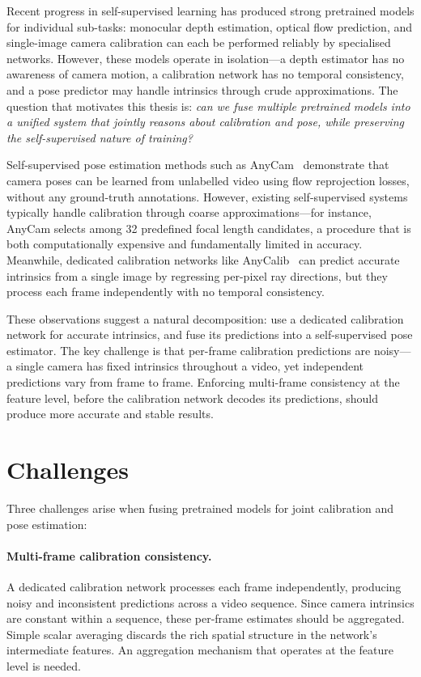 Recent progress in self-supervised learning has produced strong pretrained models for individual sub-tasks: monocular depth estimation, optical flow prediction, and single-image camera calibration can each be performed reliably by specialised networks. However, these models operate in isolation---a depth estimator has no awareness of camera motion, a calibration network has no temporal consistency, and a pose predictor may handle intrinsics through crude approximations. The question that motivates this thesis is: \emph{can we fuse multiple pretrained models into a unified system that jointly reasons about calibration and pose, while preserving the self-supervised nature of training?}

Self-supervised pose estimation methods such as AnyCam~\parencite{wimbauer2025anycam} demonstrate that camera poses can be learned from unlabelled video using flow reprojection losses, without any ground-truth annotations. However, existing self-supervised systems typically handle calibration through coarse approximations---for instance, AnyCam selects among 32 predefined focal length candidates, a procedure that is both computationally expensive and fundamentally limited in accuracy. Meanwhile, dedicated calibration networks like AnyCalib~\parencite{tirado2025anycalib} can predict accurate intrinsics from a single image by regressing per-pixel ray directions, but they process each frame independently with no temporal consistency.

These observations suggest a natural decomposition: use a dedicated calibration network for accurate intrinsics, and fuse its predictions into a self-supervised pose estimator. The key challenge is that per-frame calibration predictions are noisy---a single camera has fixed intrinsics throughout a video, yet independent predictions vary from frame to frame. Enforcing multi-frame consistency at the feature level, before the calibration network decodes its predictions, should produce more accurate and stable results.

\section{Challenges}\label{sec:challenges}

Three challenges arise when fusing pretrained models for joint calibration and pose estimation:

\paragraph{Multi-frame calibration consistency.}
A dedicated calibration network processes each frame independently, producing noisy and inconsistent predictions across a video sequence. Since camera intrinsics are constant within a sequence, these per-frame estimates should be aggregated. Simple scalar averaging discards the rich spatial structure in the network's intermediate features. An aggregation mechanism that operates at the feature level is needed.

